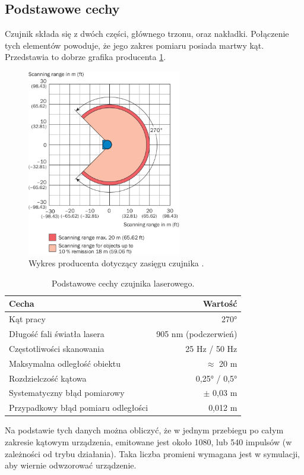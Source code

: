 	\subsection{Podstawowe cechy}
		Czujnik składa się z dwóch części, głównego trzonu, oraz nakładki.
		Połączenie tych elementów powoduje, że jego zakres pomiaru posiada martwy kąt.
		Przedstawia to dobrze grafika producenta \ref{fig:lidar}.
		\begin{figure}[h]
		\centering
		\includegraphics[width=0.6\textwidth]{graphics/sick.png}
		\caption{Wykres producenta dotyczący zasięgu czujnika \cite{sick_website}.}
		\label{fig:lidar}
		\end{figure} 
		
		\begin{table}
		\centering
		\begin{tabular}{l r}
		Cecha & Wartość \\
		\hline
		Kąt pracy & \ang{270} \\
		Długość fali światła lasera & 905 \si{\nano\metre} (podczerwień) \\
		Częstotliwości skanowania & 25 \si{\hertz} / 50 \si{\hertz} \\
		Maksymalna odległość obiektu & $\approx$ 20 \si{\metre} \\
		Rozdzielczość kątowa & 0,25° / 0,5° \\
		Systematyczny błąd pomiarowy & $\pm$ 0,03 \si{\metre} \\
		Przypadkowy błąd pomiaru odległości & 0,012 \si{\metre} \\
		\end{tabular}
		\caption{Podstawowe cechy czujnika laserowego.}
		\label{tab:lidar}
		\end{table}
		Na podstawie tych danych można obliczyć, że w jednym przebiegu po całym zakresie kątowym urządzenia, 
		emitowane jest około 1080, lub 540 impulsów (w zależności od trybu działania).
		Taka liczba promieni wymagana jest w symulacji, aby wiernie odwzorować urządzenie.

